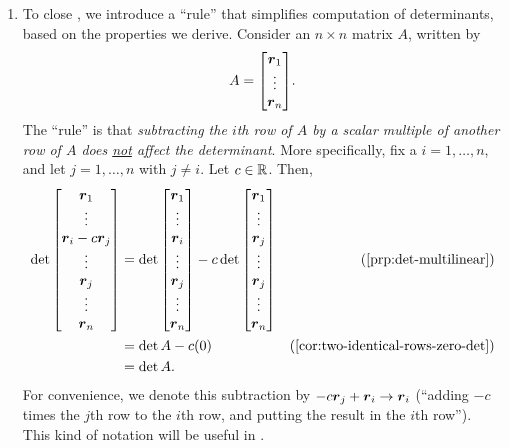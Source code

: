 \begin{enumerate}
\item \label{it:rule-simp-det-calc}
To close , we introduce a ``rule'' that simplifies
computation of determinants, based on the properties we derive. Consider an
\(n\times n\) matrix \(A\), written by
\[
A=\mqty[\vect{r}_{1}\\ \vdots\\ \vect{r}_{n}].
\]
The ``rule'' is that \emph{subtracting the \(i\)th row of \(A\) by a scalar
multiple of another row of \(A\) does \underline{not} affect the determinant}.
More specifically, fix a \(i=1,\dotsc,n\), and let \(j=1,\dotsc,n\) with \(j\ne
i\). Let \(c\in\mathbb{R}\). Then,
\begin{align*}
\det\mqty[\vect{r}_{1}\\ \vdots\\ \vect{r}_{i}-c\vect{r}_j\\\vdots\\\vect{r}_{j}\\\vdots\\ \vect{r}_{n}]
&=\det\mqty[\vect{r}_{1}\\ \vdots\\ \vect{r}_{i}\\\vdots\\\vect{r}_{j}\\\vdots\\ \vect{r}_{n}]
-c\det\mqty[\vect{r}_{1}\\ \vdots\\ \vect{r}_{j}\\\vdots\\\vect{r}_{j}\\\vdots\\ \vect{r}_{n}]&\text{(\Cref{prp:det-multilinear})}\\
&=\det A-c(0)&\text{(\Cref{cor:two-identical-rows-zero-det})}\\
&=\det A.
\end{align*}
For convenience, we denote this subtraction by \(-c\vb*{r}_{j}+\vb*{r}_{i}\to
\vb*{r}_{i}\) (``adding \(-c\) times the \(j\)th row to the \(i\)th row, and
putting the result in the \(i\)th row''). This kind of notation will be useful
in .


\end{enumerate}
